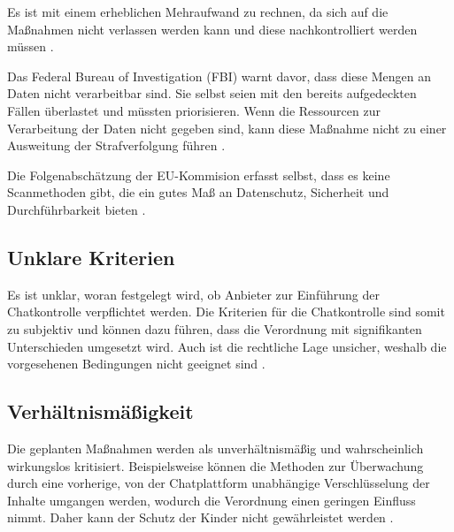 Es ist mit einem erheblichen Mehraufwand zu rechnen, da sich auf die Maßnahmen nicht verlassen werden kann und diese nachkontrolliert werden müssen \cite{np:meineck:2022}.
\label{Mehraufwand}

Das Federal Bureau of Investigation (FBI) warnt davor, dass diese Mengen an Daten nicht verarbeitbar sind. Sie selbst seien mit den bereits aufgedeckten Fällen überlastet und müssten priorisieren. Wenn die Ressourcen zur Verarbeitung der Daten nicht gegeben sind, kann diese Maßnahme nicht zu einer Ausweitung der Strafverfolgung führen \cite{edri:2023}.


Die Folgenabschätzung der \ac{EU}-Kommision erfasst selbst, \glqq dass es keine Scanmethoden gibt, die ein gutes Maß an Datenschutz, Sicherheit und Durchführbarkeit bieten\grqq{} \cite{edri:2023}.


\subsection*{Unklare Kriterien}
\label{subsec:CSA:Kritik:unklareKriterien}
Es ist unklar, woran festgelegt wird, ob Anbieter zur Einführung der Chatkontrolle verpflichtet werden. Die Kriterien für die Chatkontrolle sind somit zu subjektiv und können dazu führen, dass die Verordnung mit signifikanten Unterschieden umgesetzt wird. Auch ist die rechtliche Lage unsicher, weshalb die vorgesehenen Bedingungen nicht geeignet sind \cite{np:meineck:2022}.


\subsection*{Verhältnismäßigkeit}
\label{sec:CSA:Kritik:verhaeltnismaessigkeit}
Die geplanten Maßnahmen werden als \glqq unverhältnismäßig\grqq{} \cite{DSK:2023:Brief, edri:2023} und \glqq wahrscheinlich wirkungslos\grqq{} \cite{edri:2023} kritisiert. Beispielsweise können die Methoden zur Überwachung durch eine vorherige, von der Chatplattform unabhängige Verschlüsselung der Inhalte umgangen werden, wodurch die Verordnung einen geringen Einfluss nimmt. Daher kann der Schutz der Kinder nicht gewährleistet werden \cite{edri:2023, np:meineck:2022}.

